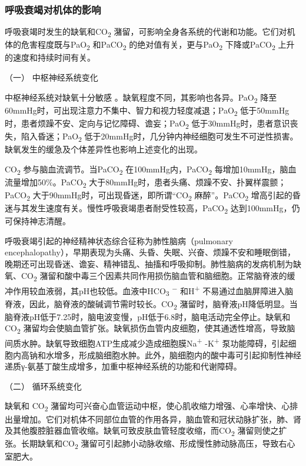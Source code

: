 \subsubsection{呼吸衰竭对机体的影响}

呼吸衰竭时发生的缺氧和CO\textsubscript{2}
潴留，可影响全身各系统的代谢和功能。它们对机体的危害程度既与PaO\textsubscript{2}
和PaCO\textsubscript{2} 的绝对值有关，更与PaO\textsubscript{2}
下降或PaCO\textsubscript{2} 上升的速度和持续时间有关。

\hypertarget{text00076.htmlux5cux23CHP3-4-1-4-1}{}
（一） 中枢神经系统变化

中枢神经系统对缺氧十分敏感
。缺氧程度不同，其影响也各异。PaO\textsubscript{2}
降至60mmHg时，可出现注意力不集中、智力和视力轻度减退；PaO\textsubscript{2}
低于50mmHg时，患者烦躁不安、定向与记忆障碍、谵妄；PaO\textsubscript{2}
低于30mmHg时，患者意识丧失，陷入昏迷；PaO\textsubscript{2}
低于20mmHg时，几分钟内神经细胞可发生不可逆性损害。缺氧发生的缓急及个体差异性也影响上述变化的出现。

CO\textsubscript{2} 参与脑血流调节。当PaCO\textsubscript{2}
在100mmHg内，PaCO\textsubscript{2}
每增加10mmHg，脑血流量增加50\%。PaCO\textsubscript{2}
大于80mmHg时，患者头痛、烦躁不安、扑翼样震颤；PaCO\textsubscript{2}
大于90mmHg时，可出现昏迷，即所谓“CO\textsubscript{2}
麻醉”。PaCO\textsubscript{2}
增高引起的昏迷与其发生速度有关。慢性呼吸衰竭患者耐受性较高，PaCO\textsubscript{2}
达到100mmHg，仍可保持神志清醒。

呼吸衰竭引起的神经精神状态综合征称为肺性脑病（pulmonary
encephalopathy），早期表现为头痛、头昏、失眠、兴奋、烦躁不安和睡眠倒错，晚期还可出现昏迷、谵妄、精神错乱、抽搐和呼吸抑制。肺性脑病的发病机制为缺氧、CO\textsubscript{2}
潴留和酸中毒三个因素共同作用损伤脑血管和脑细胞。正常脑脊液的缓冲作用较血液弱，其pH也较低。血液中HCO\textsubscript{3}
\textsuperscript{−} 和H\textsuperscript{+}
不易通过血脑屏障进入脑脊液，因此，脑脊液的酸碱调节需时较长。CO\textsubscript{2}
潴留时，脑脊液pH降低明显。当脑脊液pH低于7.25时，脑电波变慢，pH低于6.8时，脑电活动完全停止。缺氧和CO\textsubscript{2}
潴留均会使脑血管扩张。缺氧损伤血管内皮细胞，使其通透性增高，导致脑间质水肿。缺氧导致细胞ATP生成减少造成细胞膜Na\textsuperscript{+}
-K\textsuperscript{+}
泵功能障碍，引起细胞内高钠和水增多，形成脑细胞水肿。此外，脑细胞内的酸中毒可引起抑制性神经递质γ-氨基丁酸生成增多，加重中枢神经系统的功能和代谢障碍。

\hypertarget{text00076.htmlux5cux23CHP3-4-1-4-2}{}
（二） 循环系统变化

缺氧和 CO\textsubscript{2}
潴留均可兴奋心血管运动中枢，使心肌收缩力增强、心率增快、心排出量增加。它们对机体不同部位血管的作用各异，脑血管和冠状动脉扩张，肺、肾及其他腹腔脏器血管收缩。缺氧可致皮肤血管轻度收缩，而CO\textsubscript{2}
潴留则使之扩张。长期缺氧和CO\textsubscript{2}
潴留可引起肺小动脉收缩、形成慢性肺动脉高压，导致右心室肥大。

